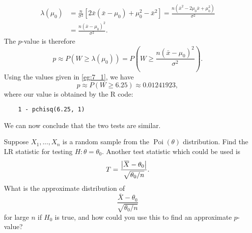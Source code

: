 \documentclass[notoc,notitlepage]{tufte-book}
\DeclareMathOperator{\Poi}{Poi }
\begin{document}
\begin{solution}
\begin{align*}
    \lambda(\mu_0) &= \frac{n}{\sigma^2} [ 2 \bar{x}( \bar{x} - \mu_0 ) + \mu_0^2 - \bar{x}^2 ] = \frac{n ( \bar{x}^2 - 2 \mu_0 \bar{x} + \mu_0^2 )}{\sigma^2} \\
                   &= \frac{n (\bar{x} - \mu_0)^2}{\sigma^2}.
  \end{align*}
  The $p$-value is therefore
  \begin{equation*}
    p \approx P(W \geq \lambda(\mu_0)) = P\left(W \geq \frac{n (\bar{x} - \mu_0)^2}{\sigma^2}\right).
  \end{equation*}
  Using the values given in \cref{eg:7_1}, we have
  \begin{equation*}
    p \approx P(W \geq 6.25) \approx 0.01241923,
  \end{equation*}
  where our value is obtained by the R code:
  \begin{lstlisting}
    1 - pchisq(6.25, 1)
  \end{lstlisting}
  We can now conclude that the two tests are similar.
\end{solution}

\begin{eg}
  Suppose $X_1, ..., X_n$ is a random sample from the $\Poi(\theta)$ distribution. Find the LR statistic for testing $H : \theta = \theta_0$. Another test statistic which could be used is
  \begin{equation*}
    T = \frac{\abs{\bar{X} - \theta_0}}{\sqrt{\theta_0 / n}}.
  \end{equation*}
  What is the approximate distribution of
  \begin{equation*}
    \frac{\bar{X} - \theta_0}{\sqrt{\theta_0 / n}}
  \end{equation*}
  for large $n$ if $H_0$ is true, and how could you use this to find an approximate $p$-value?
\end{eg}
\end{document}
